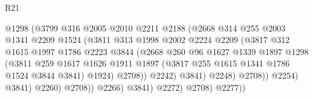 \begin{lexlean}{R21}
\begin{coremodule}
                                    @1298
                                    (@3799
                                      @316
                                      @2005
                                      @2010
                                      @2211
                                      @2188
                                      (@2668
                                        @314
                                        @255
                                        @2003
                                        @1341
                                        @2209
                                        @1524
                                        (@3811
                                          @313
                                          @1998
                                          @2002
                                          @2224
                                          @2209
                                          (@3817
                                            @312
                                            @1615
                                            @1997
                                            @1786
                                            @2223
                                            @3844
                                            (@2668
                                              @260
                                              @96
                                              @1627
                                              @1339
                                              @1897
                                              @1298
                                              (@3811
                                                @259
                                                @1617
                                                @1626
                                                @1911
                                                @1897
                                                (@3817 @255 @1615 @1341 @1786 @1524 @3844 @3841)
                                                @1924)
                                              @2708))
                                          @2242)
                                        @3841)
                                      @2248)
                                    @2708))
                                @2254)
                              @3841)
                            @2260)
                          @2708))
                      @2266)
                    @3841)
                  @2272)
                @2708)
              @2277))

\end{coremodule}
\end{lexlean}
